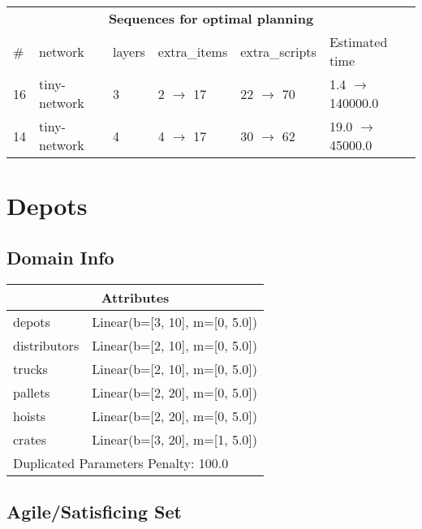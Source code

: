 \documentclass{article}
\begin{document}
                            \begin{center}
                            \begin{tabular}{l|l|l|l|l|l}
                            \multicolumn{6}{c}{\bf \large Sequences for optimal planning}\\
                            \# & network & layers & extra\_items & extra\_scripts & Estimated time\\\midrule
                            16&tiny-network&3&2 $\rightarrow$ 17&22 $\rightarrow$ 70&1.4 $\rightarrow$ 140000.0\\
14&tiny-network&4&4 $\rightarrow$ 17&30 $\rightarrow$ 62&19.0 $\rightarrow$ 45000.0
                            \end{tabular}
                            \end{center}
                    \newpage \section{Depots}
                    \subsection*{Domain Info}

                    \begin{center}
                    \begin{tabular}{p{}p{}}
                    \multicolumn{2}{c}{\bf \large Attributes}\\\midrule
                    depots & Linear(b=[3, 10], m=[0, 5.0])\\
distributors & Linear(b=[2, 10], m=[0, 5.0])\\
trucks & Linear(b=[2, 10], m=[0, 5.0])\\
pallets & Linear(b=[2, 20], m=[0, 5.0])\\
hoists & Linear(b=[2, 20], m=[0, 5.0])\\
crates & Linear(b=[3, 20], m=[1, 5.0])
                    
                     \\\midrule
                    \multicolumn{2}{l}{Duplicated Parameters Penalty: 100.0}
                    \end{tabular}
                    \end{center}
                
                         \subsection*{Agile/Satisficing Set}
\end{document}
